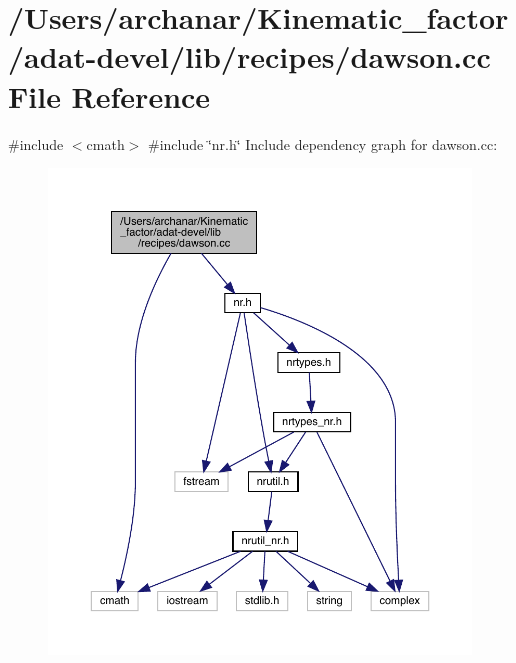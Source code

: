 \hypertarget{adat-devel_2lib_2recipes_2dawson_8cc}{}\section{/\+Users/archanar/\+Kinematic\+\_\+factor/adat-\/devel/lib/recipes/dawson.cc File Reference}
\label{adat-devel_2lib_2recipes_2dawson_8cc}
{\ttfamily \#include $<$cmath$>$}\newline
{\ttfamily \#include \char`\"{}nr.\+h\char`\"{}}\newline
Include dependency graph for dawson.\+cc\+:
\nopagebreak
\begin{figure}[H]
\begin{center}
\leavevmode
\includegraphics[width=350pt]{d0/d3a/adat-devel_2lib_2recipes_2dawson_8cc__incl}
\end{center}
\end{figure}
